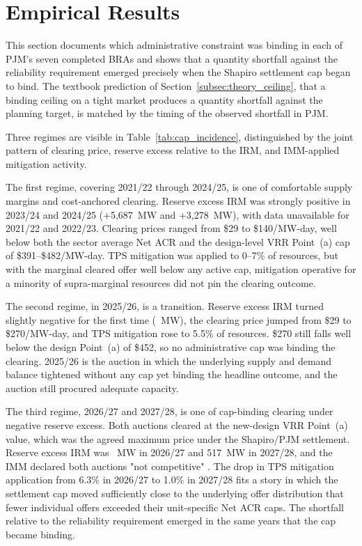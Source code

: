 
\section{Empirical Results}
\label{sec:cap_incidence}

This section documents which administrative constraint was binding in
each of PJM's seven completed BRAs and shows that a
quantity shortfall against the reliability requirement emerged
precisely when the Shapiro settlement cap began to bind. The textbook
prediction of Section~\ref{subsec:theory_ceiling}, that a binding
ceiling on a tight market produces a quantity shortfall against the
planning target, is matched by the timing of the observed shortfall in
PJM.



Three regimes are visible in Table~\ref{tab:cap_incidence},
distinguished by the joint pattern of clearing price, reserve excess
relative to the IRM, and IMM-applied mitigation activity.

The first regime, covering 2021/22 through 2024/25, is one of comfortable
supply margins and cost-anchored clearing. Reserve excess IRM was
strongly positive in 2023/24 and 2024/25 (+5{,}687~MW and +3{,}278~MW),
with data unavailable for 2021/22 and 2022/23. Clearing prices ranged
from \$29 to \$140/MW-day, well below both the sector average Net ACR
and the design-level VRR Point~(a) cap of \$391--\$482/MW-day. TPS
mitigation was applied to 0--7\% of resources, but with the marginal
cleared offer well below any active cap, mitigation operative for a
minority of supra-marginal resources did not pin the clearing outcome.

The second regime, in 2025/26, is a transition. Reserve excess IRM
turned slightly negative for the first time (~MW), the
clearing price jumped from \$29 to \$270/MW-day, and TPS mitigation
rose to 5.5\% of resources. \$270 still falls well below the design
Point~(a) of \$452, so no administrative cap was binding the clearing.
2025/26 is the auction in which the underlying supply and demand balance
tightened without any cap yet binding the headline outcome,
and the auction still procured adequate capacity.

The third regime, 2026/27 and 2027/28, is one of cap-binding
clearing under negative reserve excess. Both auctions cleared at the
new-design VRR Point~(a) value, which was the agreed maximum price under the Shapiro/PJM settlement. Reserve excess IRM was
~MW in 2026/27 and 517~MW in 2027/28, and
the IMM declared both auctions "not competitive"
\citep{MonitoringAnalytics2025_sotm}. The drop in TPS mitigation
application from 6.3\% in 2026/27 to 1.0\% in 2027/28 fits a story in
which the settlement cap moved sufficiently close to the underlying
offer distribution that fewer individual offers exceeded their
unit-specific Net ACR caps. The shortfall relative to the reliability
requirement emerged in the same years that the cap became
binding.

